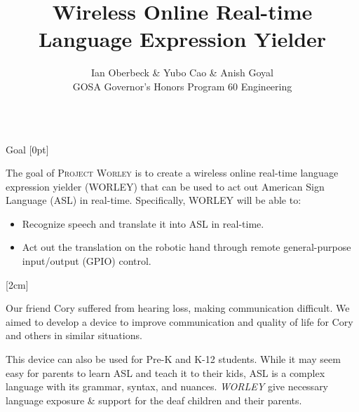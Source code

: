 \documentclass[final, 20pt]{beamer}
\title{Wireless Online Real-time Language Expression Yielder}
\author{Ian Oberbeck \& Yubo Cao \& Anish Goyal \\\normalfont\selectfont GOSA Governor's Honors Program 60 Engineering}
\newlength{\colwidth}
\begin{document}
\begin{frame}[t]
  \centering
  \begin{columns}[t]
    \margincolumn

    \begin{column}{\colwidth}
      \begin{block}{Goal}
        [0pt]

        The goal of \textsc{Project Worley} is to create a wireless online real-time language expression yielder (WORLEY) that can be used to act out American Sign Language (ASL) in real-time. Specifically, WORLEY will be able to:

        \begin{itemize}
          \item Recognize speech and translate it into ASL in real-time.
          \item Act out the translation on the robotic hand through remote general-purpose input/output (GPIO) control.
        \end{itemize}

        [2cm]

        Our friend Cory suffered from hearing loss, making communication difficult. We aimed to develop a device to improve communication and quality of life for Cory and others in similar situations.

        This device can also be used for Pre-K and K-12 students.  While it may seem easy for parents to learn ASL and teach it to their kids, ASL is a complex language with its grammar, syntax, and nuances. \emph{WORLEY} give necessary language exposure \& support for the deaf children and their parents.
      \end{block}


\end{column}
\end{columns}
\end{frame}
\end{document}
